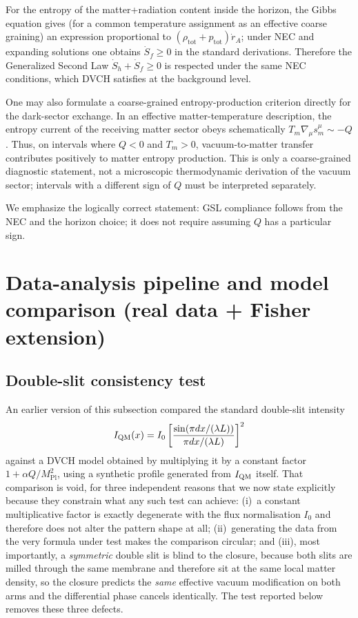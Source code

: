\documentclass[pdflatex,sn-mathphys-num]{sn-jnl}%
\newcommand{\mpl}{M_{\mathrm{Pl}}}
\begin{document}
For the entropy of the matter+radiation content inside the horizon, the Gibbs
equation gives (for a common temperature assignment as an effective coarse
graining) an expression proportional to $(\rho_{\mathrm{tot}}+p_{\mathrm{tot}})
\dot r_A$; under NEC and expanding solutions one obtains $\dot S_f\ge 0$ in the
standard derivations. Therefore the Generalized Second Law $\dot S_h+\dot S_f\ge 0$
is respected under the same NEC conditions, which DVCH satisfies at the background
level.

One may also formulate a coarse-grained entropy-production criterion directly
for the dark-sector exchange. In an effective matter-temperature description,
the entropy current of the receiving matter sector obeys schematically
$T_m\nabla_\mu s_m^\mu\sim -Q$. Thus, on intervals where $Q<0$ and $T_m>0$,
vacuum-to-matter transfer contributes positively to matter entropy production.
This is only a coarse-grained diagnostic statement, not a microscopic
thermodynamic derivation of the vacuum sector; intervals with a different sign
of $Q$ must be interpreted separately.

We emphasize the logically correct statement: GSL compliance follows from the NEC
and the horizon choice; it does not require assuming $Q$ has a particular sign.

\section{Data-analysis pipeline and model comparison (real data + Fisher extension)}
\label{sec:stats}

\subsection{Double-slit consistency test}
\label{subsec:double_slit_test}

An earlier version of this subsection compared the standard double-slit intensity
\begin{equation}
I_{\rm QM}(x)=I_0\left[\frac{\sin\!\left(\pi d x/(\lambda L)\right)}{\pi d x/(\lambda L)}\right]^2
\end{equation}
against a DVCH model obtained by multiplying it by a constant factor
$1+\alpha Q/\mpl^2$, using a synthetic profile generated from $I_{\rm QM}$
itself. That comparison is void, for three independent reasons that we now
state explicitly because they constrain what any such test can achieve:
(i)~a constant multiplicative factor is exactly degenerate with the flux
normalisation $I_0$ and therefore does not alter the pattern shape at all;
(ii)~generating the data from the very formula under test makes the comparison
circular; and (iii), most importantly, a \emph{symmetric} double slit is blind
to the closure, because both slits are milled through the same membrane and
therefore sit at the same local matter density, so the closure predicts the
\emph{same} effective vacuum modification on both arms and the differential
phase cancels identically. The test reported below removes these three defects.
\end{document}
